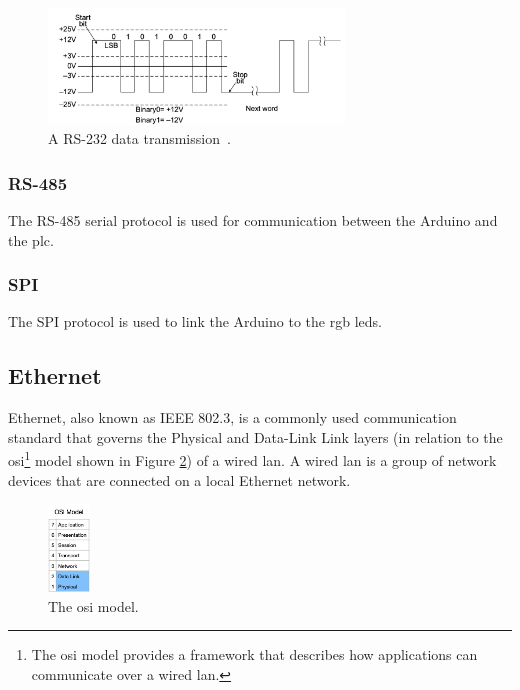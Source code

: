     \begin{figure}[H]
        \centering
        \includegraphics[width = 0.7\textwidth]{2_images/rs232Trans.png}
        \caption{A RS-232 data transmission~\cite{frenzel2015handbook}.}
        \label{fig:rs232Trans}
    \end{figure}   
    
    \subsubsection{RS-485}
    The RS-485 serial protocol is used for communication between the Arduino and the \acrshort{plc}.
    
    \subsubsection{SPI}
    The SPI protocol is used to link the Arduino to the \acrshort{rgb} \acrshort{led}s.
    

 
     
\subsection{Ethernet}
    Ethernet, also known as IEEE 802.3, is a commonly used communication standard that governs the Physical and Data-Link Link layers (in relation to the \acrshort{osi}\footnote{The \acrshort{osi} model provides a framework that describes how applications can communicate over a wired \acrshort{lan}\cite{scott2021networking}.} model shown in Figure \ref{fig:osi}) of a wired \acrshort{lan}\cite{scott2021networking}. A wired \acrfull{lan} is a group of network devices that are connected on a local Ethernet network.  
    
        \begin{figure}[H]
            \centering
            \includegraphics[width = 0.1\textwidth]{2_images/osi.png}
            \caption{The \acrshort{osi} model\cite{scott2021networking}.}
            \label{fig:osi}
        \end{figure} 
    
